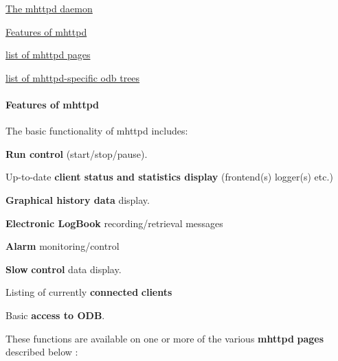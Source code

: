 \begin{DoxyItemize}
\item \hyperlink{RC_mhttpd_utility}{The mhttpd daemon}
\item \hyperlink{RC_mhttpd_RC_mhttpd_functionality}{Features of mhttpd}
\begin{DoxyItemize}
\item \hyperlink{RC_mhttpd_RC_mhttpd_page_list}{list of mhttpd pages}
\item \hyperlink{RC_mhttpd_RC_mhttpd_tree_list}{list of mhttpd-\/specific odb trees}
\end{DoxyItemize}
\end{DoxyItemize}\hypertarget{RC_mhttpd_RC_mhttpd_functionality}{}\paragraph{Features of mhttpd}\label{RC_mhttpd_RC_mhttpd_functionality}
The basic functionality of mhttpd includes:
\begin{DoxyItemize}
\item {\bfseries Run control} (start/stop/pause).
\item Up-\/to-\/date {\bfseries client status and statistics display} (frontend(s) logger(s) etc.)
\item {\bfseries Graphical history data} display.
\item {\bfseries Electronic LogBook} recording/retrieval messages
\item {\bfseries Alarm} monitoring/control
\item {\bfseries Slow} {\bfseries control} data display.
\item Listing of currently {\bfseries connected} {\bfseries clients} 
\item Basic {\bfseries access to ODB}.
\end{DoxyItemize}

These functions are available on one or more of the various {\bfseries mhttpd} {\bfseries pages} described below : \label{RC_mhttpd_RC_mhttpd_page_list}
\hypertarget{RC_mhttpd_RC_mhttpd_page_list}{}



